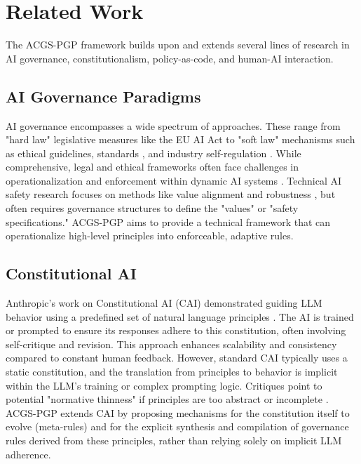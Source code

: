 \documentclass[sigconf,review,screen]{acmart}
\begin{document}
\section{Related Work}
The ACGS-PGP framework builds upon and extends several lines of research in AI governance, constitutionalism, policy-as-code, and human-AI interaction.

\subsection{AI Governance Paradigms}
AI governance encompasses a wide spectrum of approaches. These range from "hard law" legislative measures like the EU AI Act \cite{europeancommission2021aiact,veale2018fairness} to "soft law" mechanisms such as ethical guidelines, standards \cite{floridi2019ai4people,ieee2019ethically}, and industry self-regulation \cite{fjeld2020principled}. While comprehensive, legal and ethical frameworks often face challenges in operationalization and enforcement within dynamic AI systems \cite{kroll2017accountable}. Technical AI safety research focuses on methods like value alignment and robustness \cite{amodei2016concrete, hendrycks2021aligning}, but often requires governance structures to define the "values" or "safety specifications." ACGS-PGP aims to provide a technical framework that can operationalize high-level principles into enforceable, adaptive rules.

\subsection{Constitutional AI}
Anthropic's work on Constitutional AI (CAI) demonstrated guiding LLM behavior using a predefined set of natural language principles \cite{bai2022constitutional,perez2022red}. The AI is trained or prompted to ensure its responses adhere to this constitution, often involving self-critique and revision. This approach enhances scalability and consistency compared to constant human feedback. However, standard CAI typically uses a static constitution, and the translation from principles to behavior is implicit within the LLM's training or complex prompting logic. Critiques point to potential "normative thinness" if principles are too abstract or incomplete \cite{digicon2025constitutionalai}. ACGS-PGP extends CAI by proposing mechanisms for the constitution itself to evolve (meta-rules) and for the explicit synthesis and compilation of governance rules derived from these principles, rather than relying solely on implicit LLM adherence.
\end{document}
